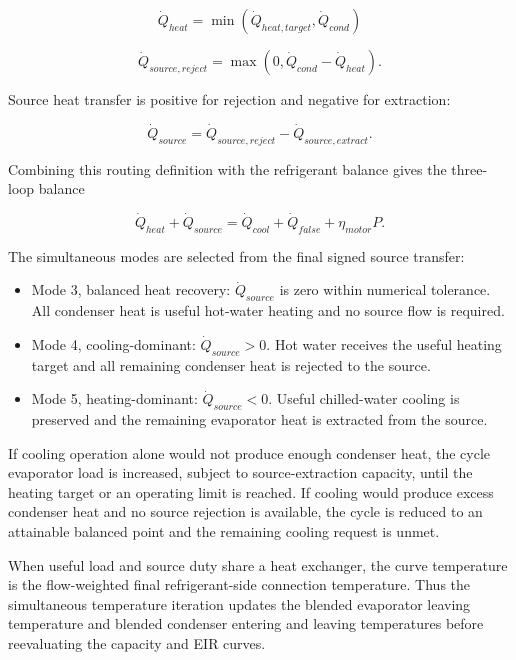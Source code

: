 \begin{equation}
\dot Q_{heat}=\min\left(\dot Q_{heat,target},\dot Q_{cond}\right)
\end{equation}

\begin{equation}
\dot Q_{source,reject}=\max\left(0,\dot Q_{cond}-\dot Q_{heat}\right).
\end{equation}

Source heat transfer is positive for rejection and negative for extraction:

\begin{equation}
\dot Q_{source}=\dot Q_{source,reject}-\dot Q_{source,extract}.
\end{equation}

Combining this routing definition with the refrigerant balance gives the three-loop balance

\begin{equation}
\dot Q_{heat}+\dot Q_{source}=\dot Q_{cool}+\dot Q_{false}+\eta_{motor}P.
\end{equation}

The simultaneous modes are selected from the final signed source transfer:

\begin{itemize}
\item Mode 3, balanced heat recovery: \(\dot Q_{source}\) is zero within numerical tolerance. All condenser heat is useful hot-water heating and no source flow is required.
\item Mode 4, cooling-dominant: \(\dot Q_{source}>0\). Hot water receives the useful heating target and all remaining condenser heat is rejected to the source.
\item Mode 5, heating-dominant: \(\dot Q_{source}<0\). Useful chilled-water cooling is preserved and the remaining evaporator heat is extracted from the source.
\end{itemize}

If cooling operation alone would not produce enough condenser heat, the cycle evaporator load is increased, subject to source-extraction capacity, until the heating target or an operating limit is reached. If cooling would produce excess condenser heat and no source rejection is available, the cycle is reduced to an attainable balanced point and the remaining cooling request is unmet.

When useful load and source duty share a heat exchanger, the curve temperature is the flow-weighted final refrigerant-side connection temperature. Thus the simultaneous temperature iteration updates the blended evaporator leaving temperature and blended condenser entering and leaving temperatures before reevaluating the capacity and EIR curves.

